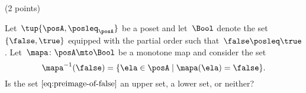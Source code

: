 \documentclass[paper=8.125in:10.250in,pagesize=pdftex,
    headinclude=false,footinclude=false,oneside,egregdoesnotlikesansseriftitles]{kaobook}
\begin{document}

\newpage

\begin{gradedexercise}\label{ex:UpperLowerPreimage}
(2 points) 

Let~$\tup{\posA, \posleq_\posA}$ be a poset and let~$\Bool$ denote the set~$\{ \false, \true \}$ equipped with the partial order such that~$\false \posleq \true$.
Let~$\mapa \colon \posA \mto \Bool$ be a monotone map and consider the set
\begin{equation}
    \label{eq:preimage-of-false}
\mapa^{-1}(\false) = \{ \ela \in \posA \mid \mapa(\ela) = \false \}.
\end{equation}
Is the set $\cref{eq:preimage-of-false}$ an upper set, a lower set, or neither? 
\end{gradedexercise}


\newpage
\end{document}
